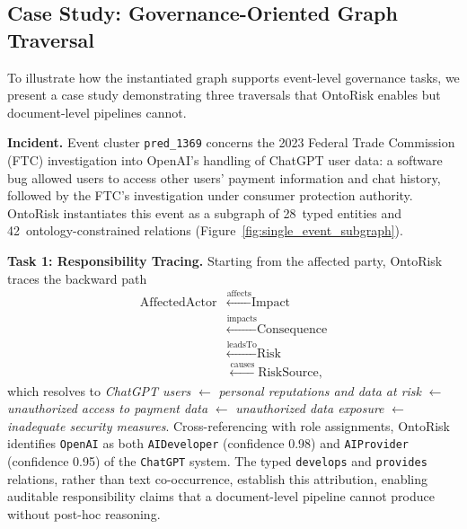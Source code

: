 \documentclass[a4paper,fleqn]{cas-dc}
\begin{document}
\subsection{Case Study: Governance-Oriented Graph Traversal}
\label{sec:case_study}

To illustrate how the instantiated graph supports event-level
governance tasks, we present a case study demonstrating three
traversals that OntoRisk enables but document-level pipelines cannot.

\textbf{Incident.}
Event cluster \texttt{pred\_1369} concerns the 2023 Federal Trade
Commission (FTC) investigation into OpenAI's handling of ChatGPT user
data: a software bug allowed users to access other users' payment
information and chat history, followed by the FTC's investigation
under consumer protection authority.
OntoRisk instantiates this event as a subgraph of 28~typed entities
and 42~ontology-constrained relations
(Figure~\ref{fig:single_event_subgraph}).

\textbf{Task 1: Responsibility Tracing.}
Starting from the affected party, OntoRisk traces the backward path
\begin{align*}
\text{AffectedActor} & \xleftarrow{\text{affects}} \text{Impact} \\
& \xleftarrow{\text{impacts}} \text{Consequence} \\
& \xleftarrow{\text{leadsTo}} \text{Risk} \\
& \xleftarrow{\text{causes}} \text{RiskSource},
\end{align*}
which resolves to \textit{ChatGPT users}
$\leftarrow$ \textit{personal reputations and data at risk}
$\leftarrow$ \textit{unauthorized access to payment data}
$\leftarrow$ \textit{unauthorized data exposure}
$\leftarrow$ \textit{inadequate security measures}.
Cross-referencing with role assignments, OntoRisk identifies
\texttt{OpenAI} as both \texttt{AIDeveloper} (confidence 0.98) and
\texttt{AIProvider} (confidence 0.95) of the \texttt{ChatGPT} system.
The typed \texttt{develops} and \texttt{provides} relations, rather
than text co-occurrence, establish this attribution, enabling auditable
responsibility claims that a document-level pipeline cannot produce
without post-hoc reasoning.
\end{document}
